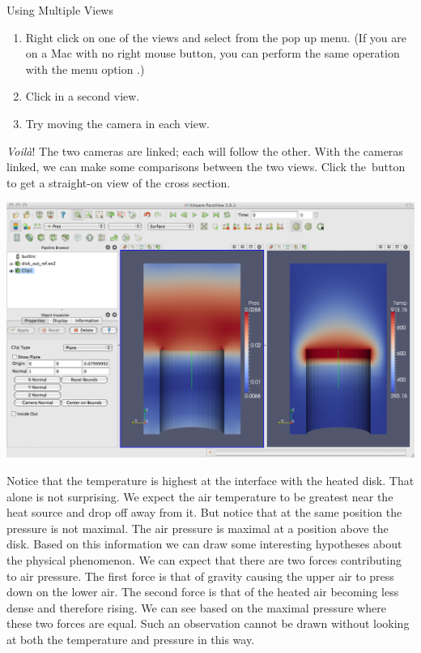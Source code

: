 \begin{exercise}{Using Multiple Views}
  \begin{enumerate}
    \restorecounter
  \item Right click on one of the views and select 
    from the pop up menu. (If you are on a Mac with no right mouse button,
    you can perform the same operation with the menu option  \ra
    .)
  \item Click in a second view.
  \item Try moving the camera in each view.
  \end{enumerate}

  \emph{Voil\`{a}}!  The two cameras are linked; each will follow the other.
  With the cameras linked, we can make some comparisons between the two
  views.  Click the~\xPlus button to get a straight-on view of the cross
  section.

  \begin{inlinefig}
    \includegraphics[width=\scw]{images/CameraLink}
  \end{inlinefig}

  Notice that the temperature is highest at the interface with the heated
  disk.  That alone is not surprising.  We expect the air temperature to be
  greatest near the heat source and drop off away from it.  But notice that
  at the same position the pressure is not maximal.  The air pressure is
  maximal at a position above the disk.  Based on this information we can
  draw some interesting hypotheses about the physical phenomenon.  We can
  expect that there are two forces contributing to air pressure.  The first
  force is that of gravity causing the upper air to press down on the lower
  air.  The second force is that of the heated air becoming less dense and
  therefore rising.  We can see based on the maximal pressure where these
  two forces are equal.  Such an observation cannot be drawn without
  looking at both the temperature and pressure in this way.
\end{exercise}

